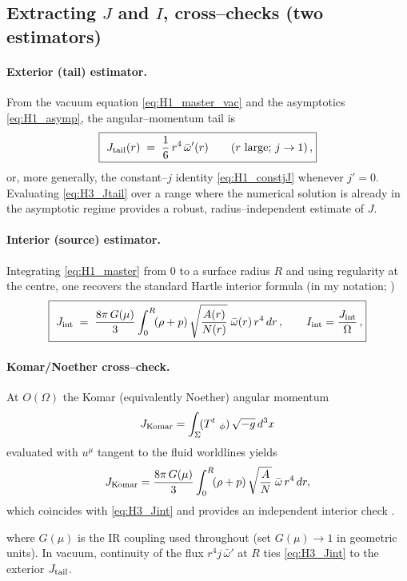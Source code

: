 \documentclass{iopjournal}
\begin{document}
\subsection{\texorpdfstring{Extracting $J$ and $I$, cross–checks (two estimators)}{Extracting J and I, cross-checks (two estimators)}}\label{app:H3}
\paragraph{Exterior (tail) estimator.}
From the vacuum equation \eqref{eq:H1_master_vac} and the asymptotics \eqref{eq:H1_asymp}, the angular–momentum tail is
\begin{equation}
\boxed{\
J_{\rm tail}(r)\;=\;\frac{1}{6}\,r^{4}\,\bar\omega'(r)\qquad (r\ \text{large;\ }j\to1)\,,
}
\label{eq:H3_Jtail}
\end{equation}
or, more generally, the constant–$j$ identity \eqref{eq:H1_constjJ} whenever $j'=0$. Evaluating \eqref{eq:H3_Jtail} over a range where the numerical solution is already in the asymptotic regime provides a robust, radius–independent estimate of $J$.

\paragraph{Interior (source) estimator.}
Integrating \eqref{eq:H1_master} from $0$ to a surface radius $R$ and using regularity at the centre, one recovers the standard Hartle interior formula (in my notation; \cite{Hartle1967,HartleThorne1968,PoissonWill2014})
\begin{equation}
\boxed{\
J_{\rm int}\;=\;\frac{8\pi\,G(\mu)}{3}\int_{0}^{R}\!(\rho+p)\,\sqrt{\frac{A(r)}{N(r)}}\;\bar\omega(r)\,r^{4}\,dr\,,\qquad
I_{\rm int}=\frac{J_{\rm int}}{\Omega}\,,
}
\label{eq:H3_Jint}
\end{equation}
\paragraph{Komar/Noether cross–check.}
At $O(\Omega)$ the Komar (equivalently Noether) angular momentum
\[
J_{\rm Komar}=\int_{\Sigma}\!(T^{t}{}_{\ \phi})\,\sqrt{-g}\,d^{3}x
\]
evaluated with $u^{\mu}$ tangent to the fluid worldlines yields
\[
J_{\rm Komar}
=\frac{8\pi\,G(\mu)}{3}\int_{0}^{R}\!(\rho+p)\,\sqrt{\frac{A}{N}}\;\bar\omega\,r^{4}\,dr,
\]
which coincides with \eqref{eq:H3_Jint} and provides an independent interior check \cite{Hartle1967,HartleThorne1968,PoissonWill2014}.

where $G(\mu)$ is the IR coupling used throughout (set $G(\mu)\!\to\!1$ in geometric units). In vacuum, continuity of the flux $r^{4}j\,\bar\omega'$ at $R$ ties \eqref{eq:H3_Jint} to the exterior $J_{\rm tail}$.
\end{document}
